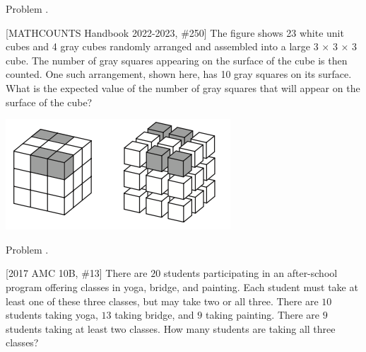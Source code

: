 \documentclass[9pt]{beamer}
\newcounter{problem}[section]
\begin{document}
\begin{frame}[t, fragile]{Problem \thesection.\theproblem}
    \begin{block}{}[MATHCOUNTS Handbook 2022-2023, \#250]
The figure shows 23 white unit cubes and 4 gray cubes randomly arranged and assembled into a large 3 × 3 × 3 cube. The number of gray squares appearing on the surface of the cube is then counted. One such arrangement, shown here, has 10 gray squares on its surface. What is the expected value of the number of gray squares that will appear on the surface of the cube?
    \end{block}
    \begin{center}
        \includegraphics[]{hb_22_250}
    \end{center}    
\end{frame}

\begin{frame}[t, fragile]{Problem \thesection.\theproblem}
    \begin{block}{}[2017 AMC 10B, \#13]
There are $20$ students participating in an after-school program offering classes in yoga, bridge, and painting. Each student must take at least one of these three classes, but may take two or all three. There are $10$ students taking yoga, $13$ taking bridge, and $9$ taking painting. There are $9$ students taking at least two classes. How many students are taking all three classes?
    
	
    \end{block}
\end{frame}
\end{document}
